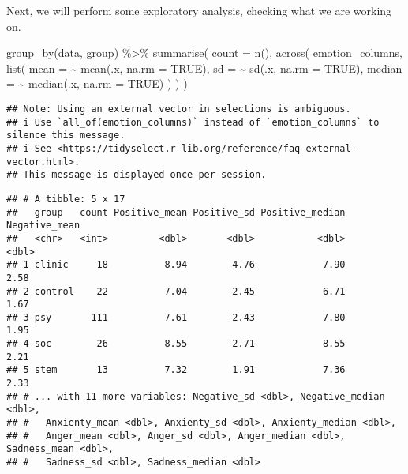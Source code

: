 \documentclass[
]{article}
\newenvironment{Shaded}{\begin{snugshade}}{\end{snugshade}}
\newcommand{\AttributeTok}[1]{\textcolor[rgb]{0.77,0.63,0.00}{#1}}
\newcommand{\ConstantTok}[1]{\textcolor[rgb]{0.00,0.00,0.00}{#1}}
\newcommand{\FunctionTok}[1]{\textcolor[rgb]{0.00,0.00,0.00}{#1}}
\newcommand{\NormalTok}[1]{#1}
\newcommand{\SpecialCharTok}[1]{\textcolor[rgb]{0.00,0.00,0.00}{#1}}
\begin{document}
Next, we will perform some exploratory analysis, checking what we are
working on.

\begin{Shaded}
\begin{Highlighting}[]
\FunctionTok{group\_by}\NormalTok{(data, group) }\SpecialCharTok{\%\textgreater{}\%}
  \FunctionTok{summarise}\NormalTok{(}
    \AttributeTok{count =} \FunctionTok{n}\NormalTok{(),}
    \FunctionTok{across}\NormalTok{(}
\NormalTok{      emotion\_columns,}
      \FunctionTok{list}\NormalTok{(}
        \AttributeTok{mean =} \SpecialCharTok{\textasciitilde{}} \FunctionTok{mean}\NormalTok{(.x, }\AttributeTok{na.rm =} \ConstantTok{TRUE}\NormalTok{),}
        \AttributeTok{sd =} \SpecialCharTok{\textasciitilde{}} \FunctionTok{sd}\NormalTok{(.x, }\AttributeTok{na.rm =} \ConstantTok{TRUE}\NormalTok{),}
        \AttributeTok{median =} \SpecialCharTok{\textasciitilde{}} \FunctionTok{median}\NormalTok{(.x, }\AttributeTok{na.rm =} \ConstantTok{TRUE}\NormalTok{)}
\NormalTok{      )}
\NormalTok{    )}
\NormalTok{  )}
\end{Highlighting}
\end{Shaded}

\begin{verbatim}
## Note: Using an external vector in selections is ambiguous.
## i Use `all_of(emotion_columns)` instead of `emotion_columns` to silence this message.
## i See <https://tidyselect.r-lib.org/reference/faq-external-vector.html>.
## This message is displayed once per session.
\end{verbatim}

\begin{verbatim}
## # A tibble: 5 x 17
##   group   count Positive_mean Positive_sd Positive_median Negative_mean
##   <chr>   <int>         <dbl>       <dbl>           <dbl>         <dbl>
## 1 clinic     18          8.94        4.76            7.90          2.58
## 2 control    22          7.04        2.45            6.71          1.67
## 3 psy       111          7.61        2.43            7.80          1.95
## 4 soc        26          8.55        2.71            8.55          2.21
## 5 stem       13          7.32        1.91            7.36          2.33
## # ... with 11 more variables: Negative_sd <dbl>, Negative_median <dbl>,
## #   Anxienty_mean <dbl>, Anxienty_sd <dbl>, Anxienty_median <dbl>,
## #   Anger_mean <dbl>, Anger_sd <dbl>, Anger_median <dbl>, Sadness_mean <dbl>,
## #   Sadness_sd <dbl>, Sadness_median <dbl>
\end{verbatim}
\end{document}
